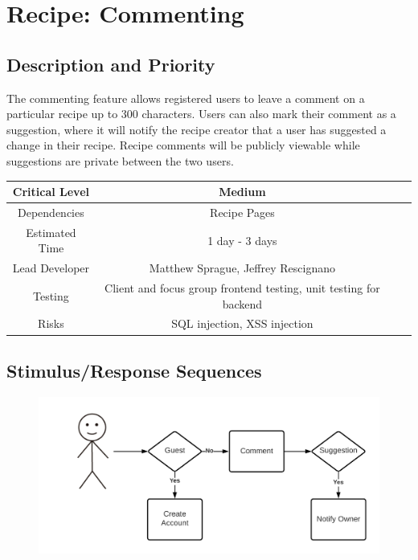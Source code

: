 \documentclass{scrreprt}
\begin{document}
\section{Recipe: Commenting}

\subsection{Description and Priority}

The commenting feature allows registered users to leave a comment on a particular recipe up to 300 characters. Users can also mark their comment as a suggestion, where it will notify the recipe creator that a user has suggested a change in their recipe. Recipe comments will be publicly viewable while suggestions are private between the two users.

\begin{center}
    \begin{tabular}{| c | c | c | c |}
        \hline
        Critical Level & Medium                                                            \\
        \hline
        Dependencies   & Recipe Pages                                                      \\
        \hline
        Estimated Time & 1 day - 3 days                                                    \\
        \hline
        Lead Developer & Matthew Sprague, Jeffrey Rescignano                               \\
        \hline
        Testing        & Client and focus group frontend testing, unit testing for backend \\
        \hline
        Risks          & \gls{SQL injection}, \gls{XSS injection}                          \\
        \hline
    \end{tabular}
\end{center}

\subsection{Stimulus/Response Sequences}

\begin{figure}[H]\centering
    \includegraphics[width=\columnwidth]{FlowCharts/Recipe-Commenting.png}
\end{figure}
\end{document}
